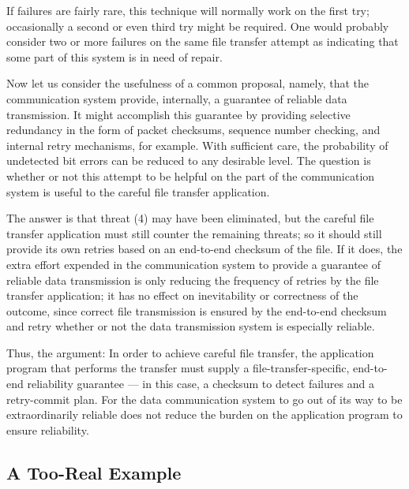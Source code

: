 \documentclass[a4paper,12pt,notitlepage,twoside,openright]{article}
\begin{document}
If failures are fairly rare, this technique will normally work on the
first try; occasionally a second or even third try might be required.
One would probably consider two or more failures on the same file
transfer attempt as indicating that some part of this system is in need
of repair.


Now let us consider the usefulness of a common proposal, namely, that
the communication system provide, internally, a guarantee of reliable
data transmission. It might accomplish this guarantee by providing
selective redundancy in the form of packet checksums, sequence number
checking, and internal retry mechanisms, for example. With sufficient
care, the probability of undetected bit errors can be reduced to any
desirable level. The question is whether or not this attempt to be
helpful on the part of the communication system is useful to the careful
file transfer application.

The answer is that threat (4) may have been eliminated, but the careful
file transfer application must still counter the remaining threats; so
it should still provide its own retries based on an end-to-end checksum
of the file. If it does, the extra effort expended in the communication
system to provide a guarantee of reliable data transmission is only
reducing the frequency of retries by the file transfer application; it
has no effect on inevitability or correctness of the outcome, since
correct file transmission is ensured by the end-to-end checksum and
retry whether or not the data transmission system is especially
reliable.

Thus, the argument: In order to achieve careful file transfer, the
application program that performs the transfer must supply a
file-transfer-specific, end-to-end reliability guarantee --- in this
case, a checksum to detect failures and a retry-commit plan. For the
data communication system to go out of its way to be extraordinarily
reliable does not reduce the burden on the application program to ensure
reliability.


\hypertarget{a-too-real-example}{%
\subsection{A Too-Real Example}\label{a-too-real-example}}
\end{document}
